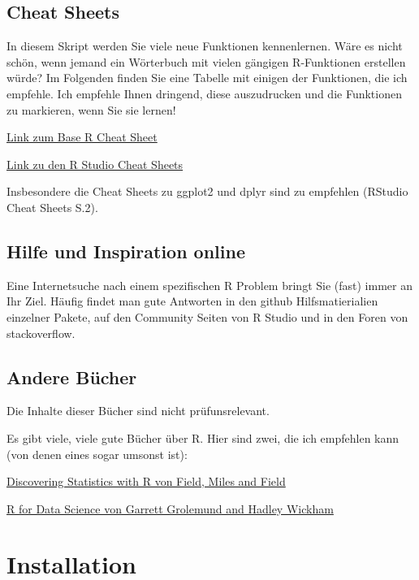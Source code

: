 \documentclass[
]{book}
\begin{document}
\hypertarget{cheat-sheets}{%
\section{Cheat Sheets}\label{cheat-sheets}}

In diesem Skript werden Sie viele neue Funktionen kennenlernen. Wäre es nicht schön, wenn jemand ein Wörterbuch mit vielen gängigen R-Funktionen erstellen würde? Im Folgenden finden Sie eine Tabelle mit einigen der Funktionen, die ich empfehle. Ich empfehle Ihnen dringend, diese auszudrucken und die Funktionen zu markieren, wenn Sie sie lernen!

\href{https://cran.r-project.org/doc/contrib/Short-refcard.pdf}{Link zum Base R Cheat Sheet}

\href{https://www.rstudio.com/resources/cheatsheets/}{Link zu den R Studio Cheat Sheets}

Insbesondere die Cheat Sheets zu ggplot2 und dplyr sind zu empfehlen (RStudio Cheat Sheets S.2).

\hypertarget{hilfe-und-inspiration-online}{%
\section{Hilfe und Inspiration online}\label{hilfe-und-inspiration-online}}

Eine Internetsuche nach einem spezifischen R Problem bringt Sie (fast) immer an Ihr Ziel. Häufig findet man gute Antworten in den github Hilfsmatierialien einzelner Pakete, auf den Community Seiten von R Studio und in den Foren von stackoverflow.

\hypertarget{andere-buxfccher}{%
\section{Andere Bücher}\label{andere-buxfccher}}

Die Inhalte dieser Bücher sind nicht prüfunsrelevant.

Es gibt viele, viele gute Bücher über R. Hier sind zwei, die ich empfehlen kann (von denen eines sogar umsonst ist):

\href{https://www.amazon.com/Discovering-Statistics-Using-Andy-Field/dp/1446200469/ref=sr_1_2?ie=UTF8\&qid=1487759316\&sr=8-2\&keywords=statistics+with+r}{Discovering Statistics with R von Field, Miles and Field}

\href{http://r4ds.had.co.nz}{R for Data Science von Garrett Grolemund and Hadley Wickham}

\hypertarget{installation}{%
\chapter{Installation}\label{installation}}
\end{document}
